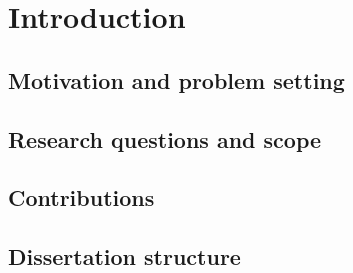\chapter{Introduction}
\label{ch:introduction}


\section{Motivation and problem setting}
\label{sec:intro-motivation}

\section{Research questions and scope}
\label{sec:intro-questions}

\section{Contributions}
\label{sec:intro-contributions}

\section{Dissertation structure}
\label{sec:intro-structure}
